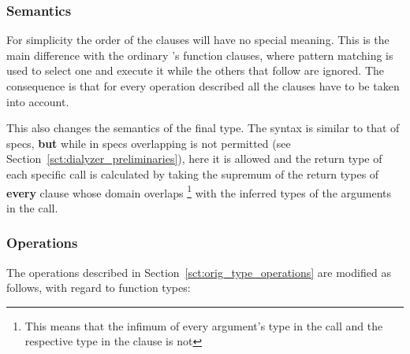 \subsubsection{Semantics}
\label{sct:intersection_semantics}

For simplicity the order of the clauses will have no special
meaning. This is the main difference with the ordinary \er's function
clauses, where pattern matching is used to select one and execute it
while the others that follow are ignored. The consequence is that for
every operation described all the clauses have to be taken into
account.

This also changes the semantics of the final type. The syntax is
similar to that of specs, \textbf{but} while in specs overlapping is
not permitted (see Section~\ref{sct:dialyzer_preliminaries}), here it
is allowed and the return type of each specific call is calculated by
taking the supremum of the return types of \textbf{every} clause whose
domain overlaps \footnote{This means that the infimum of every
  argument's type in the call and the respective type in the clause is
  not \none} with the inferred types of the arguments in the call.

\subsubsection{Operations}

The operations described in Section~\ref{sct:orig_type_operations} are
modified as follows, with regard to function types:

